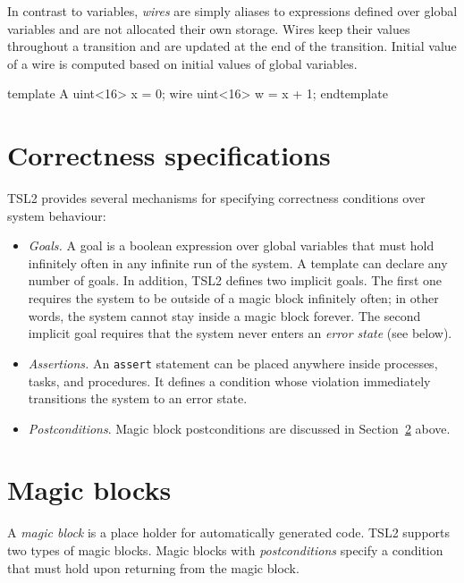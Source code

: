 \documentclass{report}
\newcommand{\src}[1]{\texttt{#1}}
\newcommand{\tsl}{TSL2 }
\begin{document}
In contrast to variables, \emph{wires} are simply aliases to 
expressions defined over global variables and are not allocated 
their own storage.  Wires keep their values throughout a 
transition and are updated at the end of the transition.  Initial 
value of a wire is computed based on initial values of global 
variables.

\begin{tsllisting}{}
template A
  uint<16> x = 0;
  wire uint<16> w = x + 1;
endtemplate
\end{tsllisting}


\section{Correctness specifications}\label{s:o:correctness}

\tsl provides several mechanisms for specifying correctness 
conditions over system behaviour:
\begin{itemize}
    \item \emph{Goals.} A goal is a boolean expression over global 
        variables that must hold infinitely often in any infinite 
        run of the system.  A template can declare any number of 
        goals.  In addition, \tsl defines two implicit goals.  The 
        first one requires the system to be outside of a magic 
        block infinitely often; in other words, the system cannot 
        stay inside a magic block forever.  The second implicit 
        goal requires that the system never enters an \emph{error 
        state} (see below).
    \item \emph{Assertions.}  An \src{assert} statement can be 
        placed anywhere inside processes, tasks, and procedures.  
        It defines a condition whose violation immediately 
        transitions the system to an error state.
    \item \emph{Postconditions}.  Magic block postconditions are 
        discussed in Section~\ref{s:o:magic} above.
\end{itemize}



\section{Magic blocks}\label{s:o:magic}

A \emph{magic block} is a place holder for automatically generated 
code.  \tsl supports two types of magic blocks.  Magic blocks with 
\emph{postconditions} specify a condition that must hold upon 
returning from the magic block.  
\end{document}

